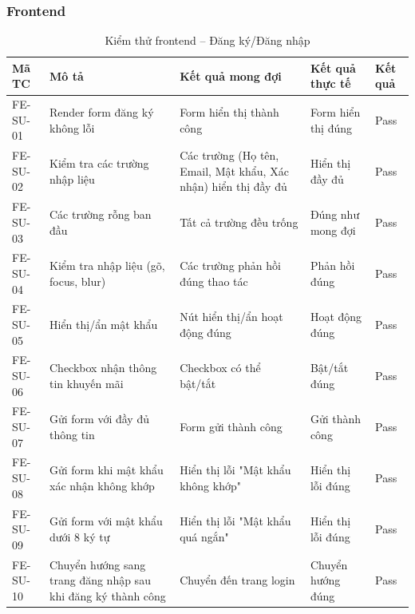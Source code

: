 \subsubsection{Frontend}
\begin{table}[H]
\centering
\caption{Kiểm thử frontend – Đăng ký/Đăng nhập}
\label{tab:fe_sign}
\begin{tabular}{|p{1.8cm}|p{4cm}|p{4cm}|p{2.2cm}|p{1.5cm}|}
\hline
\textbf{Mã TC} & \textbf{Mô tả} & \textbf{Kết quả mong đợi} & \textbf{Kết quả thực tế} & \textbf{Kết quả} \\ \hline
FE-SU-01 & Render form đăng ký không lỗi & Form hiển thị thành công & Form hiển thị đúng & Pass \\ \hline
FE-SU-02 & Kiểm tra các trường nhập liệu & Các trường (Họ tên, Email, Mật khẩu, Xác nhận) hiển thị đầy đủ & Hiển thị đầy đủ & Pass \\ \hline
FE-SU-03 & Các trường rỗng ban đầu & Tất cả trường đều trống & Đúng như mong đợi & Pass \\ \hline
FE-SU-04 & Kiểm tra nhập liệu (gõ, focus, blur) & Các trường phản hồi đúng thao tác & Phản hồi đúng & Pass \\ \hline
FE-SU-05 & Hiển thị/ẩn mật khẩu & Nút hiển thị/ẩn hoạt động đúng & Hoạt động đúng & Pass \\ \hline
FE-SU-06 & Checkbox nhận thông tin khuyến mãi & Checkbox có thể bật/tắt & Bật/tắt đúng & Pass \\ \hline
FE-SU-07 & Gửi form với đầy đủ thông tin & Form gửi thành công & Gửi thành công & Pass \\ \hline
FE-SU-08 & Gửi form khi mật khẩu xác nhận không khớp & Hiển thị lỗi "Mật khẩu không khớp" & Hiển thị lỗi đúng & Pass \\ \hline
FE-SU-09 & Gửi form với mật khẩu dưới 8 ký tự & Hiển thị lỗi "Mật khẩu quá ngắn" & Hiển thị lỗi đúng & Pass \\ \hline
FE-SU-10 & Chuyển hướng sang trang đăng nhập sau khi đăng ký thành công & Chuyển đến trang login & Chuyển hướng đúng & Pass \\ \hline
\end{tabular}
\end{table}

